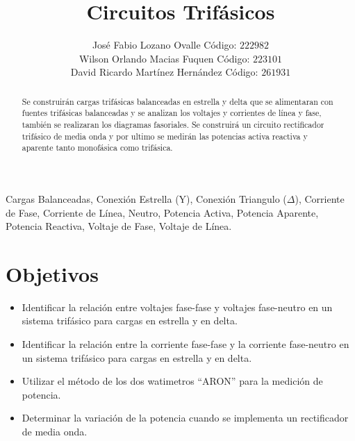 \documentclass[twocolumn]{IEEEtran}
\begin{document}
\title{Circuitos Trifásicos}
\author{José Fabio Lozano Ovalle Código: $222982$\\
	Wilson Orlando Macias Fuquen Código: $223101$\\
	David Ricardo Martínez Hernández Código: $261931$}
\maketitle
{}

\begin{abstract}
Se construirán cargas trifásicas balanceadas en estrella y delta  que  se alimentaran con fuentes trifásicas balanceadas  y se analizan los voltajes y corrientes de línea y fase, también  se realizaran los diagramas fasoriales. Se construirá un circuito rectificador trifásico de media onda y por ultimo se medirán las potencias activa reactiva y aparente tanto monofásica como trifásica.
\end{abstract}

\begin{keywords}
Cargas Balanceadas, Conexión Estrella (Y), Conexión Triangulo ($\Delta$), Corriente de Fase, Corriente de Línea, Neutro, Potencia Activa, Potencia Aparente, Potencia Reactiva, Voltaje de Fase, Voltaje de Línea.
\end{keywords}

\section{Objetivos}
\begin{itemize}
 \item Identificar la relación entre voltajes fase-fase y voltajes fase-neutro en un sistema trifásico para cargas en estrella y en delta.
 \item Identificar la relación entre la corriente fase-fase y la corriente fase-neutro en un sistema trifásico para cargas en estrella y en delta.
 \item Utilizar el método de los dos watimetros “ARON” para la medición de potencia.
 \item Determinar la variación de la potencia cuando se implementa un rectificador de media onda.
\end{itemize}
\end{document}
